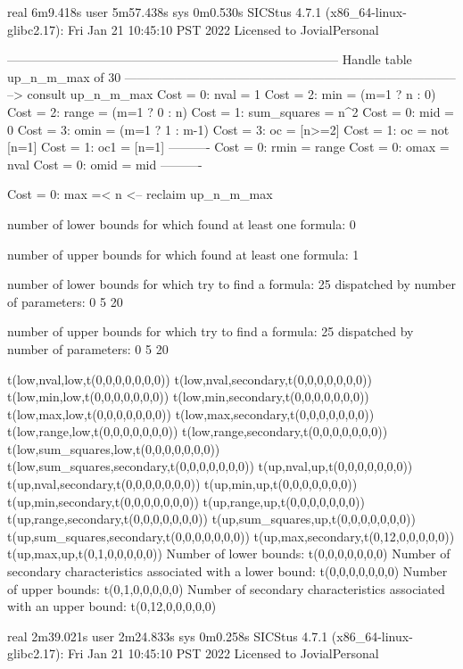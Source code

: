 real	6m9.418s
user	5m57.438s
sys	0m0.530s
SICStus 4.7.1 (x86_64-linux-glibc2.17): Fri Jan 21 10:45:10 PST 2022
Licensed to JovialPersonal


--------------------------------------------------------------------------------
Handle table up_n_m_max of 30
--------------------------------------------------------------------------------
--> consult up_n_m_max
Cost =  0:  nval        = 1
Cost =  2:  min         = (m=1 ? n : 0)
Cost =  2:  range       = (m=1 ? 0 : n)
Cost =  1:  sum_squares = n^2
Cost =  0:  mid         = 0
Cost =  3:  omin        = (m=1 ? 1 : m-1)
Cost =  3:  oc          = [n>=2]
Cost =  1:  oc          = not [n=1]
Cost =  1:  oc1         = [n=1]
----------
Cost =  0:  rmin        = range
Cost =  0:  omax        = nval
Cost =  0:  omid        = mid
----------

Cost =  0:  max =< n
<-- reclaim up_n_m_max

number of lower bounds for which found at least one formula: 0

number of upper bounds for which found at least one formula: 1

number of lower bounds for which try to find a formula: 25
dispatched by number of parameters: 0  5  20

number of upper bounds for which try to find a formula: 25
dispatched by number of parameters: 0  5  20

t(low,nval,low,t(0,0,0,0,0,0,0))
t(low,nval,secondary,t(0,0,0,0,0,0,0))
t(low,min,low,t(0,0,0,0,0,0,0))
t(low,min,secondary,t(0,0,0,0,0,0,0))
t(low,max,low,t(0,0,0,0,0,0,0))
t(low,max,secondary,t(0,0,0,0,0,0,0))
t(low,range,low,t(0,0,0,0,0,0,0))
t(low,range,secondary,t(0,0,0,0,0,0,0))
t(low,sum_squares,low,t(0,0,0,0,0,0,0))
t(low,sum_squares,secondary,t(0,0,0,0,0,0,0))
t(up,nval,up,t(0,0,0,0,0,0,0))
t(up,nval,secondary,t(0,0,0,0,0,0,0))
t(up,min,up,t(0,0,0,0,0,0,0))
t(up,min,secondary,t(0,0,0,0,0,0,0))
t(up,range,up,t(0,0,0,0,0,0,0))
t(up,range,secondary,t(0,0,0,0,0,0,0))
t(up,sum_squares,up,t(0,0,0,0,0,0,0))
t(up,sum_squares,secondary,t(0,0,0,0,0,0,0))
t(up,max,secondary,t(0,12,0,0,0,0,0))
t(up,max,up,t(0,1,0,0,0,0,0))
Number of lower bounds:                                             t(0,0,0,0,0,0,0)
Number of secondary characteristics associated with a lower bound:  t(0,0,0,0,0,0,0)
Number of upper bounds:                                             t(0,1,0,0,0,0,0)
Number of secondary characteristics associated with an upper bound: t(0,12,0,0,0,0,0)

real	2m39.021s
user	2m24.833s
sys	0m0.258s
SICStus 4.7.1 (x86_64-linux-glibc2.17): Fri Jan 21 10:45:10 PST 2022
Licensed to JovialPersonal


